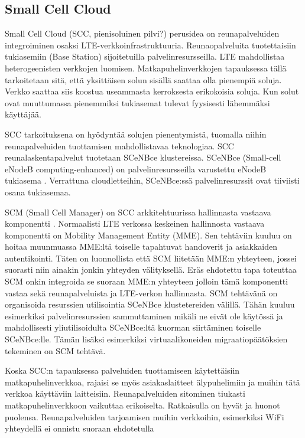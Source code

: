 \subsection{Small Cell Cloud}
Small Cell Cloud (SCC, pienisoluinen pilvi?) perusidea on reunapalveluiden integroiminen osaksi LTE-verkkoinfrastruktuuria. 
Reunaopalveluita tuotettaisiin tukiasemiin (Base Station) sijoitetuilla palvelinresursseilla.
LTE mahdollistaa heterogeenisten verkkojen luomisen. Matkapuhelinverkkojen tapauksessa tällä tarkoitetaan sitä, että yksittäisen solun sisällä saattaa olla pienempiä soluja.
Verkko saattaa siis koostua useammasta kerroksesta erikokoisia soluja. 
Kun solut ovat muuttumassa pienemmiksi tukiasemat tulevat fyysisesti lähemmäksi käyttäjää.

SCC tarkoituksena on hyödyntää solujen pienentymistä, tuomalla niihin reunapalveluiden tuottamisen mahdollistavaa teknologiaa.
SCC reunalaskentapalvelut tuotetaan SCeNBce klustereissa. 
SCeNBce (Small-cell eNodeB computing-enhanced) on palvelinresursseilla varustettu eNodeB tukiasema \cite{lobillo15scc}.
Verrattuna cloudletteihin, SCeNBce:ssä palvelinresurssit ovat tiiviisti osana tukiasemaa.

SCM (Small Cell Manager) on SCC arkkitehtuurissa hallinnasta vastaava komponentti \cite{gambetti15dist}. Normaalisti LTE verkossa keskeinen hallinnosta vastaava komponentti on Mobility Management Entity (MME). Sen tehtäviin kuuluu on hoitaa muunmuassa MME:ltä toiselle tapahtuvat handoverit ja asiakkaiden autentikointi. Täten on luonnollista että SCM liitetään MME:n yhteyteen, jossei suorasti niin ainakin jonkin yhteyden välityksellä. Eräs ehdotettu tapa toteuttaa SCM onkin integroida se suoraan MME:n yhteyteen jolloin tämä komponentti vastaa sekä reunapalveluista ja LTE-verkon hallinnasta\cite{lobillo15scc}. SCM tehtävänä on organisoida resurssien utilisointia SCeNBce klustetereiden välillä. Tähän kuuluu esimerkiksi palvelinresurssien sammuttaminen mikäli ne eivät ole käytössä ja mahdollisesti yliutilisoidulta SCeNBce:ltä kuorman siirtäminen toiselle SCeNBce:lle. Tämän lisäksi esimerkiksi virtuaalikoneiden migraatiopäätöksien tekeminen on SCM tehtävä.

Koska SCC:n tapauksessa palveluiden tuottamiseen käytettäisiin matkapuhelinverkkoa, rajaisi se myös asiakaslaitteet älypuhelimiin ja muihin tätä verkkoa käyttäviin laitteisiin.
Reunapalveluiden sitominen tiukasti matkapuhelinverkkoon vaikuttaa erikoiselta.
Ratkaisulla on hyvät ja huonot puolensa. Reunapalveluiden tarjoamisen muihin verkkoihin, esimerkiksi WiFi yhteydellä ei onnistu suoraan ehdotetulla 

